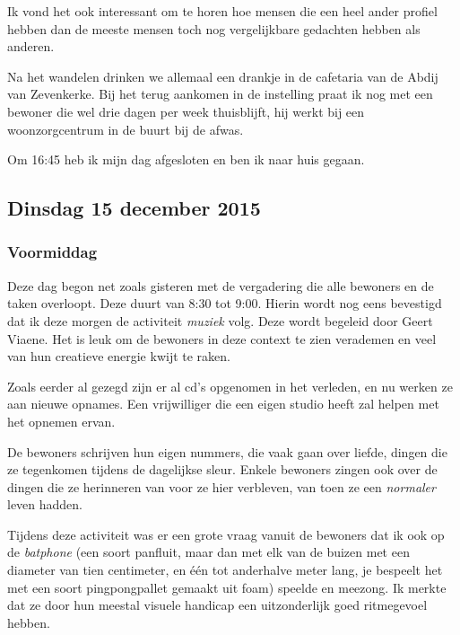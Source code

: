 \documentclass[a4paper,12pt]{article}
\begin{document}
Ik vond het ook interessant om te horen hoe mensen die een heel ander profiel hebben dan de meeste mensen toch nog vergelijkbare gedachten hebben als anderen.

Na het wandelen drinken we allemaal een drankje in de cafetaria van de Abdij van Zevenkerke. Bij het terug aankomen in de instelling praat ik nog met een bewoner die wel drie dagen per week thuisblijft, hij werkt bij een woonzorgcentrum in de buurt bij de afwas.

Om 16:45 heb ik mijn dag afgesloten en ben ik naar huis gegaan.

\subsection{Dinsdag 15 december 2015}

\subsubsection{Voormiddag}

Deze dag begon net zoals gisteren met de vergadering die alle bewoners en de taken overloopt. Deze duurt van 8:30 tot 9:00. Hierin wordt nog eens bevestigd dat ik deze morgen de activiteit \emph{muziek} volg. Deze wordt begeleid door Geert Viaene. Het is leuk om de bewoners in deze context te zien verademen en veel van hun creatieve energie kwijt te raken.

Zoals eerder al gezegd zijn er al cd's opgenomen in het verleden, en nu werken ze aan nieuwe opnames. Een vrijwilliger die een eigen studio heeft zal helpen met het opnemen ervan.

De bewoners schrijven hun eigen nummers, die vaak gaan over liefde, dingen die ze tegenkomen tijdens de dagelijkse sleur. Enkele bewoners zingen ook over de dingen die ze herinneren van voor ze hier verbleven, van toen ze een \emph{normaler} leven hadden.

Tijdens deze activiteit was er een grote vraag vanuit de bewoners dat ik ook op de \emph{batphone} (een soort panfluit, maar dan met elk van de buizen met een diameter van tien centimeter, en één tot anderhalve meter lang, je bespeelt het met een soort pingpongpallet gemaakt uit foam) speelde en meezong. Ik merkte dat ze door hun meestal visuele handicap een uitzonderlijk goed ritmegevoel hebben.
\end{document}
